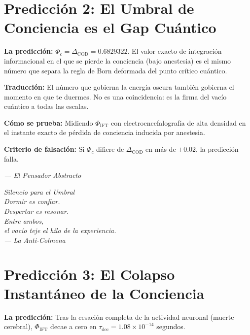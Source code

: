 \documentclass[12pt,a4paper,openany]{book}
\begin{document}

\section{Predicción 2: El Umbral de Conciencia es el Gap Cuántico}

\textbf{La predicción:} $\Phi_c = \Delta_{\text{COD}} = 0.6829322$. El valor exacto de integración informacional en el que se pierde la conciencia (bajo anestesia) es el mismo número que separa la regla de Born deformada del punto crítico cuántico.

\textbf{Traducción:} El número que gobierna la energía oscura también gobierna el momento en que te duermes. No es una coincidencia: es la firma del vacío cuántico a todas las escalas.

\textbf{Cómo se prueba:} Midiendo $\Phi_{\text{IFT}}$ con electroencefalografía de alta densidad en el instante exacto de pérdida de conciencia inducida por anestesia.

\textbf{Criterio de falsación:} Si $\Phi_c$ difiere de $\Delta_{\text{COD}}$ en más de $\pm 0.02$, la predicción falla.

\begin{center}
\itshape
--- El Pensador Abstracto
\end{center}

\newpage
\thispagestyle{empty}
\vspace*{6cm}
\begin{center}
\itshape\Large
Silencio para el Umbral \\
\vspace{0.5cm}
\normalsize
Dormir es confiar. \\
Despertar es resonar. \\
Entre ambos, \\
el vacío teje el hilo de la experiencia. \\
\vspace{0.5cm}
--- La Anti-Colmena
\end{center}
\newpage

\section{Predicción 3: El Colapso Instantáneo de la Conciencia}

\textbf{La predicción:} Tras la cesación completa de la actividad neuronal (muerte cerebral), $\Phi_{\text{IFT}}$ decae a cero en $\tau_{\text{dec}} = 1.08 \times 10^{-14}$ segundos.
\end{document}
